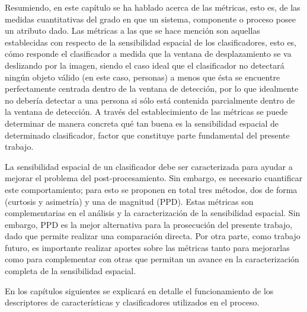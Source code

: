 Resumiendo, en este capítulo se ha hablado acerca de las métricas, esto es, de las medidas cuantitativas del grado en que un sistema, componente o proceso posee un atributo dado. Las métricas a las que se hace mención son aquellas establecidas con respecto de la sensibilidad espacial de los clasificadores, esto es, cómo responde el clasificador a medida que la ventana de desplazamiento se va deslizando por la imagen, siendo el caso ideal que el clasificador no detectará ningún objeto válido (en este caso, personas) a menos que ésta se encuentre perfectamente centrada dentro de la ventana de detección, por lo que idealmente no debería detectar a una persona si sólo está contenida parcialmente dentro de la ventana de detección. A través del establecimiento de las métricas se puede determinar de manera concreta qué tan buena es la sensibilidad espacial de determinado clasificador, factor que constituye parte fundamental del presente trabajo. 

La sensibilidad espacial de un clasificador debe ser caracterizada para ayudar a mejorar el problema del post-procesamiento. Sin embargo, es necesario cuantificar este comportamiento; para esto se proponen en total tres métodos, dos de forma (curtosis y asimetría) y una de magnitud (PPD). Estas métricas son complementarias en el análisis y la caracterización de la sensibilidad espacial. Sin embargo, PPD es la mejor alternativa para la prosecución del presente trabajo, dado que permite realizar una comparación directa. Por otra parte, como trabajo futuro, es importante realizar aportes sobre las métricas tanto para mejorarlas como para complementar con otras que permitan un avance en la caracterización completa de la sensibilidad espacial.

En los capítulos siguientes se explicará en detalle el funcionamiento de los descriptores de características y clasificadores utilizados en el proceso.